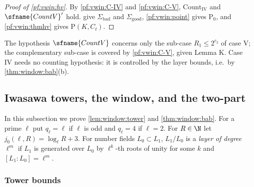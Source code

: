 \begin{proof}[Proof of \cref{pf:vwin:hv}]
By \ref{pf:vwin:C-IV} and \ref{pf:vwin:C-V}, $\mathrm{Count}_{\mathrm{IV}}$ and $\sfname{CountV}'$ hold.  give
$\Sigma_{\mathrm{bad}}$ and $\Sigma_{\mathrm{good}}$, \cref{pf:vwin:point} gives $\mathrm{P}_0$, and \cref{pf:vwin:thmhv} gives
$\mathrm{P}(K,C_t)$.
\end{proof}

\begin{remark}\label{pf:vwin:rem-plus}
The hypothesis $\sfname{CountV}$ concerns only the sub-case $R_1\le2^{c_2}$ of case V; the complementary sub-case is
covered by \ref{pf:vwin:C-V}, given Lemma K. Case IV needs no counting hypothesis: it is controlled by the layer bounds, i.e.\
by \cref{thm:window:bab}(b).
\end{remark}


\subsection{Iwasawa towers, the window, and the two-part}\label{sec:pf:vwin:towers}

In this subsection we prove \cref{lem:window:tower} and \cref{thm:window:bab}. For a prime $\ell$ put $q_\ell=\ell$ if $\ell$
is odd and $q_\ell=4$ if $\ell=2$. For $R\in\N$ let $j_0(\ell,R)=\log_\ell R+3$. For number fields $L_0\subset L_1$, $L_1/L_0$
is a \emph{layer of degree $\ell^m$} if $L_1$ is generated over $L_0$ by $\ell^k$-th roots of unity for some $k$ and
$[L_1:L_0]=\ell^m$.

\subsubsection{Tower bounds}

